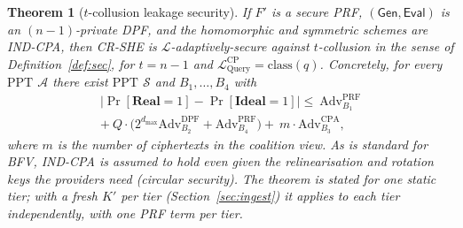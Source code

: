 \documentclass[a4paper,fleqn]{cas-sc}
\newtheorem{theorem}{Theorem}
\newcommand{\PPT}{\mathrm{PPT}}
\newcommand{\Real}{\mathbf{Real}}
\newcommand{\Ideal}{\mathbf{Ideal}}
\newcommand{\Leak}{\mathcal{L}}
\newcommand{\Sim}{\mathcal{S}}
\newcommand{\Adv}{\mathcal{A}}
\newcommand{\Gen}{\mathsf{Gen}}
\newcommand{\Eval}{\mathsf{Eval}}
\begin{document}
\begin{theorem}[$t$-collusion leakage security]
\label{thm:sec}
If $F'$ is a secure PRF, $(\Gen,\Eval)$ is an $(n{-}1)$-private DPF, and the
homomorphic and symmetric schemes are IND-CPA, then CR-SHE is
$\Leak$-adaptively-secure against $t$-collusion in the sense of
Definition~\ref{def:sec}, for $t=n-1$ and
$\Leak^{\text{CP}}_{\mathrm{Query}}=\mathrm{class}(q)$. Concretely, for every
$\PPT$ $\Adv$ there exist $\PPT$ $\Sim$ and $B_1,\dots,B_4$ with
\begin{multline*}
\big|\Pr[\Real{=}1]-\Pr[\Ideal{=}1]\big|
\le\ \mathrm{Adv}^{\mathrm{PRF}}_{B_1}\\
+\ Q\cdot\big(2^{d_{\max}}\mathrm{Adv}^{\mathrm{DPF}}_{B_2}
+\mathrm{Adv}^{\mathrm{PRF}}_{B_4}\big)
+\ m\cdot\mathrm{Adv}^{\mathrm{CPA}}_{B_3},
\end{multline*}
where $m$ is the number of ciphertexts in the coalition view. As is standard
for BFV, IND-CPA is assumed to hold even given the relinearisation and
rotation keys the providers need (circular security). The theorem is stated
for one static tier; with a fresh $K'$ per tier
(Section~\ref{sec:ingest}) it applies to each tier independently, with one PRF
term per tier.
\end{theorem}
\end{document}
